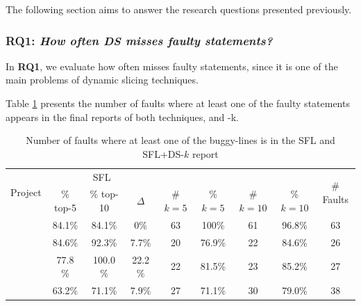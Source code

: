 \documentclass{article}
\begin{document}
The following section aims to answer the research questions presented previously.


\subsubsection{RQ1: \textit{How often DS misses faulty statements?}}
\label{sec:fault-misses}

In \textbf{RQ1}, we evaluate how often \ds{} misses faulty statements, since it is one of the main problems of dynamic slicing techniques.

Table \ref{table:fsws} presents the number of faults where at least one of the faulty statements appears in the final reports of both techniques, \sfl{} and \comb{}-k.


\begin{table}[h]
	\centering
	  \begin{tabular}{|l|ccc|cccc|c|}
		\toprule
		\multirow{2}{*}{Project}            & \multicolumn{3}{c|}{SFL}  & \multicolumn{4}{c|}{\combpar{k}} & \multirow{2}{*}{\# Faults} \\

		            & \% top-5 & \% top-10  & $\Delta$ & \# $k = 5$ & \% $k = 5$ & \# $k = 10$ & \% $k = 10$ &  \\
		\midrule
		 \lang{}            & 84.1\%  & 84.1\%  &  0\%   & 63 & 100\% & 61 & 96.8\% & 63      \\
		\chart{}           & 84.6\%  & 92.3\% & 7.7\%  & 20 & 76.9\% & 22 & 84.6\% & 26    \\  %
		\jtime{}           & 77.8 \%  & 100.0 \% & 22.2 \%  & 22 & 81.5\% & 23 & 85.2\% & 27     \\   %
		 \mockito{}         & 63.2\%  & 71.1\% & 7.9\%   & 27 & 71.1\% & 30 & 79.0\% & 38 \\     %
		\bottomrule
	\end{tabular}
  \caption {Number of faults where at least one of the buggy-lines is in the SFL and SFL+DS-$k$ report }
  \label{table:fsws}
\end{table}
\end{document}
